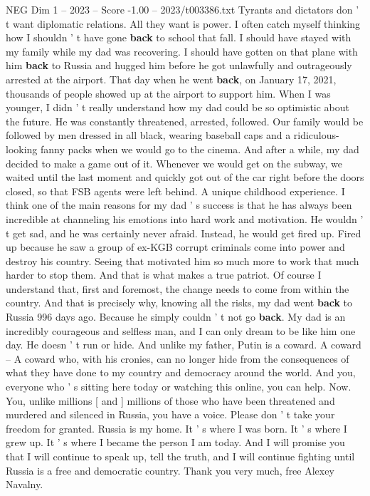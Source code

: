 \begin{textsample}{NEG Dim 1 – 2023 – Score -1.00 – 2023/t003386.txt}
Tyrants and dictators don ' t want diplomatic relations.
All they want is power.
I often catch myself thinking how I shouldn ' t have gone \textbf{back} to school that fall.
I should have stayed with my family while my dad was recovering.
I should have gotten on that plane with him \textbf{back} to Russia and hugged him before he got unlawfully and outrageously arrested at the airport.
That day when he went \textbf{back}, on January 17, 2021, thousands of people showed up at the airport to support him.
When I was younger, I didn ' t really understand how my dad could be so optimistic about the future.
He was constantly threatened, arrested, followed.
Our family would be followed by men dressed in all black, wearing baseball caps and a ridiculous-looking fanny packs when we would go to the cinema.
And after a while, my dad decided to make a game out of it.
Whenever we would get on the subway, we waited until the last moment and quickly got out of the car right before the doors closed, so that FSB agents were left behind.
A unique childhood experience.
I think one of the main reasons for my dad ' s success is that he has always been incredible at channeling his emotions into hard work and motivation.
He wouldn ' t get sad, and he was certainly never afraid.
Instead, he would get fired up.
Fired up because he saw a group of ex-KGB corrupt criminals come into power and destroy his country.
Seeing that motivated him so much more to work that much harder to stop them.
And that is what makes a true patriot.
Of course I understand that, first and foremost, the change needs to come from within the country.
And that is precisely why, knowing all the risks, my dad went \textbf{back} to Russia 996 days ago.
Because he simply couldn ' t not go \textbf{back}.
My dad is an incredibly courageous and selfless man, and I can only dream to be like him one day.
He doesn ' t run or hide.
And unlike my father, Putin is a coward.
A coward -- A coward who, with his cronies, can no longer hide from the consequences of what they have done to my country and democracy around the world.
And you, everyone who ' s sitting here today or watching this online, you can help.
Now.
You, unlike millions [ and ] millions of those who have been threatened and murdered and silenced in Russia, you have a voice.
Please don ' t take your freedom for granted.
Russia is my home.
It ' s where I was born.
It ' s where I grew up.
It ' s where I became the person I am today.
And I will promise you that I will continue to speak up, tell the truth, and I will continue fighting until Russia is a free and democratic country.
Thank you very much, free Alexey Navalny.

\end{textsample}
